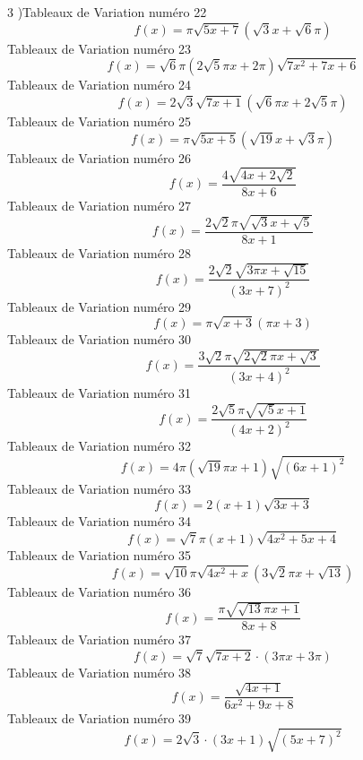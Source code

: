 \documentclass{article}
\begin{document}
3 \right)\]Tableaux de Variation num\'ero 22 \[f(x) = \pi \sqrt{5 x + 7} \left(\sqrt{3} x + \sqrt{6} \pi\right)\]Tableaux de Variation num\'ero 23 \[f(x) = \sqrt{6} \pi \left(2 \sqrt{5} \pi x + 2 \pi\right) \sqrt{7 x^{2} + 7 x + 6}\]Tableaux de Variation num\'ero 24 \[f(x) = 2 \sqrt{3} \sqrt{7 x + 1} \left(\sqrt{6} \pi x + 2 \sqrt{5} \pi\right)\]Tableaux de Variation num\'ero 25 \[f(x) = \pi \sqrt{5 x + 5} \left(\sqrt{19} x + \sqrt{3} \pi\right)\]Tableaux de Variation num\'ero 26 \[f(x) = \frac{4 \sqrt{4 x + 2 \sqrt{2}}}{8 x + 6}\]Tableaux de Variation num\'ero 27 \[f(x) = \frac{2 \sqrt{2} \pi \sqrt{\sqrt{3} x + \sqrt{5}}}{8 x + 1}\]Tableaux de Variation num\'ero 28 \[f(x) = \frac{2 \sqrt{2} \sqrt{3 \pi x + \sqrt{15}}}{\left(3 x + 7\right)^{2}}\]Tableaux de Variation num\'ero 29 \[f(x) = \pi \sqrt{x + 3} \left(\pi x + 3\right)\]Tableaux de Variation num\'ero 30 \[f(x) = \frac{3 \sqrt{2} \pi \sqrt{2 \sqrt{2} \pi x + \sqrt{3}}}{\left(3 x + 4\right)^{2}}\]Tableaux de Variation num\'ero 31 \[f(x) = \frac{2 \sqrt{5} \pi \sqrt{\sqrt{5} x + 1}}{\left(4 x + 2\right)^{2}}\]Tableaux de Variation num\'ero 32 \[f(x) = 4 \pi \left(\sqrt{19} \pi x + 1\right) \sqrt{\left(6 x + 1\right)^{2}}\]Tableaux de Variation num\'ero 33 \[f(x) = 2 \left(x + 1\right) \sqrt{3 x + 3}\]Tableaux de Variation num\'ero 34 \[f(x) = \sqrt{7} \pi \left(x + 1\right) \sqrt{4 x^{2} + 5 x + 4}\]Tableaux de Variation num\'ero 35 \[f(x) = \sqrt{10} \pi \sqrt{4 x^{2} + x} \left(3 \sqrt{2} \pi x + \sqrt{13}\right)\]Tableaux de Variation num\'ero 36 \[f(x) = \frac{\pi \sqrt{\sqrt{13} \pi x + 1}}{8 x + 8}\]Tableaux de Variation num\'ero 37 \[f(x) = \sqrt{7} \sqrt{7 x + 2} \cdot \left(3 \pi x + 3 \pi\right)\]Tableaux de Variation num\'ero 38 \[f(x) = \frac{\sqrt{4 x + 1}}{6 x^{2} + 9 x + 8}\]Tableaux de Variation num\'ero 39 \[f(x) = 2 \sqrt{3} \cdot \left(3 x + 1\right) \sqrt{\left(5 x + 7\right)^{2}}\]
\end{document}
